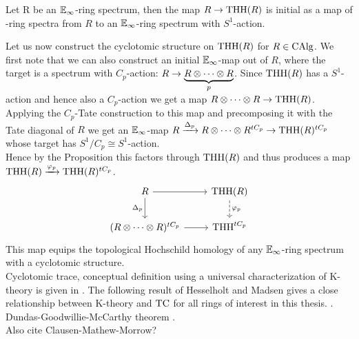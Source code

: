 \begin{prop}
Let R be an $\mathbb{E}_\infty$-ring spectrum, then the map $R\rightarrow \operatorname{THH}(R)$ is initial as a map of \Einf-ring spectra from $R$ to an $\mathbb{E}_\infty$-ring spectrum with $S^1$-action.
\end{prop}
Let us now construct the cyclotomic structure on $\operatorname{THH}(R)$ for $R\in \operatorname{CAlg}$.
We first note that we can also construct an initial $\mathbb{E}_\infty$-map out of $R$, where the target is a spectrum with $C_p$-action: $R\rightarrow \underbrace{R\otimes\dots\otimes R}_{p}$.
Since $\operatorname{THH}(R)$ has a $S^1$-action and hence also a $C_p$-action we get a map $R\otimes\dots\otimes R\rightarrow \operatorname{THH}(R)$. Applying the $C_p$-Tate construction to this map and precomposing it with the Tate diagonal of $R$ we get an $\mathbb{E}_\infty$-map $R\xrightarrow{\Delta_p} R\otimes\dots\otimes R^{tC_p}\rightarrow \operatorname{THH}(R)^{tC_p}$ whose target has $S^1/C_p\cong S^1$-action.
\\
Hence by the Proposition this factors through $\operatorname{THH}(R)$ and thus produces a map $\operatorname{THH}(R)\xrightarrow{\varphi_p} \operatorname{THH}(R)^{tC_p}$.
\[\begin{tikzcd}
	{R} & {\text{THH}(R)} \\
	{(R\otimes\dots\otimes R)^{tC_p}} & {\text{THH}^{tC_p}}
	\arrow[from=1-1, to=1-2]
	\arrow["{\varphi_p}", from=1-2, to=2-2, dashed]
	\arrow["{\Delta_p}"', from=1-1, to=2-1]
	\arrow[from=2-1, to=2-2]
\end{tikzcd}\]
This map equips the topological Hochschild homology of any $\mathbb{E}_\infty$-ring spectrum with a cyclotomic structure. \\
Cyclotomic trace, conceptual definition using a universal characterization of K-theory is given in \cite[Section~10.3]{BGTuniversal}.
The following result of Hesselholt and Madsen gives a close relationship between K-theory and $\operatorname{TC}$ for all rings of interest in this thesis. \cite[Theorem~D]{HMWV}. \\
Dundas-Goodwillie-McCarthy theorem \cite[Theorem~7.2.2.1]{DundasGoodwillieMccarthyLocalstructure}.\\
Also cite Clausen-Mathew-Morrow?
